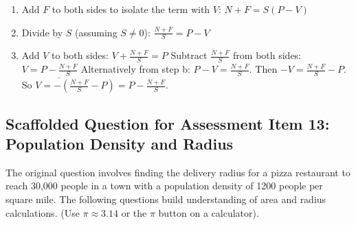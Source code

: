 \documentclass[12pt]{article}
\begin{document}
\begin{enumerate}[label=10.\arabic*]
\begin{enumerate}[label=\alph*)]
        \item Add \(F\) to both sides to isolate the term with \( V \): \( N + F = S(P - V) \)
        \item Divide by \(S\) (assuming \(S \neq 0\)): \( \frac{N + F}{S} = P - V \)
        \item Add \(V\) to both sides: \( V + \frac{N + F}{S} = P \)
        Subtract \( \frac{N + F}{S} \) from both sides: \( V = \underline{P - \frac{N + F}{S}} \)
        Alternatively from step b: \(P-V = \frac{N+F}{S}\). Then \(-V = \frac{N+F}{S} - P\). So \(V = -\left(\frac{N+F}{S} - P\right) = P - \frac{N+F}{S}\).
    \end{enumerate}
\end{enumerate}

\subsection*{Scaffolded Question for Assessment Item 13: Population Density and Radius}
The original question involves finding the delivery radius for a pizza restaurant to reach 30,000 people in a town with a population density of 1200 people per square mile. The following questions build understanding of area and radius calculations. (Use \( \pi \approx 3.14 \) or the \(\pi\) button on a calculator).
\end{document}
